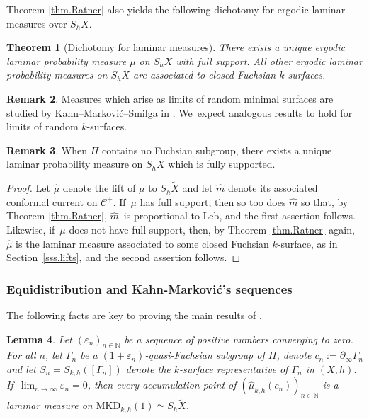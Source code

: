 \documentclass[11pt]{article}
\newcommand{\ksurface}{$k$\nobreakdash-surface\xspace}
\newcommand{\ksurfaces}{$k$\nobreakdash-surfaces\xspace}
\theoremstyle{plain}
\newtheorem{theorem}{Theorem}[section]
\newtheorem{lemma}[theorem]{Lemma}
\theoremstyle{definition}
\newtheorem{remark}[theorem]{Remark}
\newcommand{\cC}{{\mathcal C}}
\let\eps\varepsilon
\newcommand{\Leb}{\mathrm{Leb}}
\newcommand{\MKD}{\mathrm{MKD}}
\newcommand{\bord}{\partial_{\infty}}
\begin{document}
Theorem \ref{thm.Ratner} also yields the following dichotomy for ergodic laminar measures over $S_hX$.

\begin{theorem}[Dichotomy for laminar measures]\label{thm.dichotomy_laminar} There exists a unique ergodic laminar probability measure $\mu$ on $S_hX$ with full support. All other ergodic laminar probability measures on $S_hX$ are associated to closed Fuchsian \ksurfaces.
\end{theorem}

\begin{remark}
Measures which arise as limits of random minimal surfaces are studied by Kahn--Markovi\'c--Smilga in \cite{KMS}. We~expect analogous results to hold for limits of random \ksurfaces.
\end{remark}

\begin{remark}
When $\Pi$ contains no Fuchsian subgroup, there exists a unique laminar probability measure on $S_hX$ which is fully supported.
\end{remark}

\begin{proof}
Let $\hat\mu$ denote the lift of $\mu$ to $S_h\tilde{X}$ and let $\hat m$ denote its associated conformal current on $\cC^+$. If~$\mu$ has full support, then so too does $\hat m$ so that, by Theorem \ref{thm.Ratner}, $\hat m$~is proportional to $\Leb$, and the first assertion follows. Likewise, if~$\mu$ does not have full support, then, by Theorem \ref{thm.Ratner} again, $\hat\mu$ is the laminar measure associated to some closed Fuchsian \ksurface, as in Section~\ref{sss.lifts}, and the second assertion follows.
\end{proof}

\subsubsection{Equidistribution and Kahn-Markovi\'c's sequences} The following facts are key to proving the main results of \cite{ALS}.

\begin{lemma}\label{lem.conv_fuchsian}
Let $(\eps_n)_{n\in\mathbb{N}}$ be a sequence of positive numbers converging to zero. For all $n$, let $\Gamma_n$ be a $(1+\eps_n)$-quasi-Fuchsian subgroup of $\Pi$, denote $c_n:=\bord\Gamma_n$ and let $S_n=S_{k,h}([\Gamma_n])$ denote the \ksurface representative of $\Gamma_n$ in $(X,h)$. If~$\lim_{n\to\infty}\eps_n=0$, then every accumulation point of $(\hat\mu_{k,h}(c_n))_{n\in\mathbb{N}}$ is a laminar measure on $\MKD_{k,h}(1)\simeq S_{h}\tilde{X}$.
\end{lemma}
\end{document}
